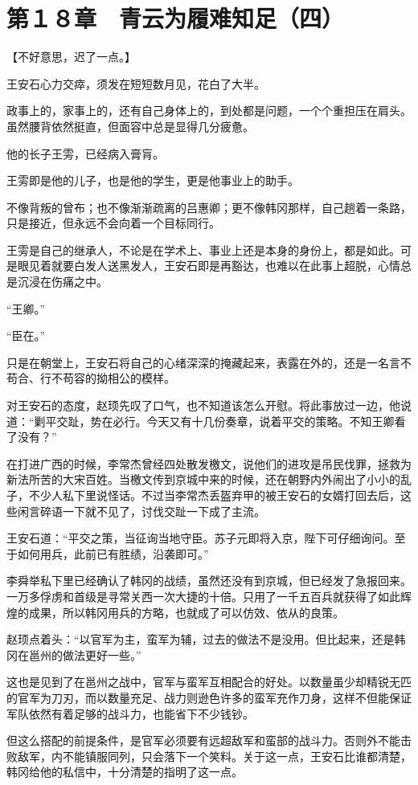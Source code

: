 \section{第１８章　青云为履难知足（四）}

【不好意思，迟了一点。】

王安石心力交瘁，须发在短短数月见，花白了大半。

政事上的，家事上的，还有自己身体上的，到处都是问题，一个个重担压在肩头。虽然腰背依然挺直，但面容中总是显得几分疲惫。

他的长子王雱，已经病入膏肓。

王雱即是他的儿子，也是他的学生，更是他事业上的助手。

不像背叛的曾布；也不像渐渐疏离的吕惠卿；更不像韩冈那样，自己趟着一条路，只是接近，但永远不会向着一个目标同行。

王雱是自己的继承人，不论是在学术上、事业上还是本身的身份上，都是如此。可是眼见着就要白发人送黑发人，王安石即是再豁达，也难以在此事上超脱，心情总是沉浸在伤痛之中。

“王卿。”

“臣在。”

只是在朝堂上，王安石将自己的心绪深深的掩藏起来，表露在外的，还是一名言不苟合、行不苟容的拗相公的模样。

对王安石的态度，赵顼先叹了口气，也不知道该怎么开慰。将此事放过一边，他说道：“剿平交趾，势在必行。今天又有十几份奏章，说着平交的策略。不知王卿看了没有？”

在打进广西的时候，李常杰曾经四处散发檄文，说他们的进攻是吊民伐罪，拯救为新法所苦的大宋百姓。当檄文传到京城中来的时候，还在朝野内外闹出了小小的乱子，不少人私下里说怪话。不过当李常杰丢盔弃甲的被王安石的女婿打回去后，这些闲言碎语一下就不见了，讨伐交趾一下成了主流。

王安石道：“平交之策，当征询当地守臣。苏子元即将入京，陛下可仔细询问。至于如何用兵，此前已有胜绩，沿袭即可。”

李舜举私下里已经确认了韩冈的战绩，虽然还没有到京城，但已经发了急报回来。一万多俘虏和首级是寻常关西一次大捷的十倍。只用了一千五百兵就获得了如此辉煌的成果，所以韩冈用兵的方略，也就成了可以仿效、依从的良策。

赵顼点着头：“以官军为主，蛮军为辅，过去的做法不是没用。但比起来，还是韩冈在邕州的做法更好一些。”

这也是见到了在邕州之战中，官军与蛮军互相配合的好处。以数量虽少却精锐无匹的官军为刀刃，而以数量充足、战力则逊色许多的蛮军充作刀身，这样不但能保证军队依然有着足够的战斗力，也能省下不少钱钞。

但这么搭配的前提条件，是官军必须要有远超敌军和蛮部的战斗力。否则外不能击败敌军，内不能镇服同列，只会落下一个笑料。关于这一点，王安石比谁都清楚，韩冈给他的私信中，十分清楚的指明了这一点。

